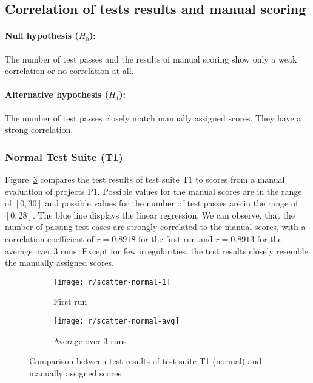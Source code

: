 \subsection{Correlation of tests results and manual scoring}

\paragraph{Null hypothesis ($H_0$):}
The number of test passes and the results of manual scoring show only a weak correlation or no correlation at all.
\vspace{-\medskipamount}
\paragraph{Alternative hypothesis ($H_1$):}
The number of test passes closely match manually assigned scores.
They have a strong correlation.
\parspace

\subsubsection{Normal Test Suite (T1)}

Figure~\ref{fig:scatter_normal} compares the test results of test suite T1 to scores from a manual evaluation of projects P1.
Possible values for the manual scores are in the range of $[0, 30]$ and possible values for the number of test passes are in the range of $[0, 28]$.
The blue line displays the linear regression.
We can observe, that the number of passing test cases are strongly correlated to the manual scores,
with a correlation coefficient of $r = 0.8918$ for the first run and $r = 0.8913$ for the average over 3 runs.
Except for few irregularities, the test results closely resemble the manually assigned scores.

\begin{figure}[htpb]
    \centering
    \begin{subfigure}{.50\textwidth}
        \texttt{[image: r/scatter-normal-1]}
        \caption{First run}
        \label{fig:scatter_normal_1}
    \end{subfigure}%
    \begin{subfigure}{.50\textwidth}
        \texttt{[image: r/scatter-normal-avg]}
        \caption{Average over 3 runs}
        \label{fig:scatter_normal_avg}
    \end{subfigure}
    \caption{Comparison between test results of test suite T1 (normal) and manually assigned scores}
    \label{fig:scatter_normal}
\end{figure}

